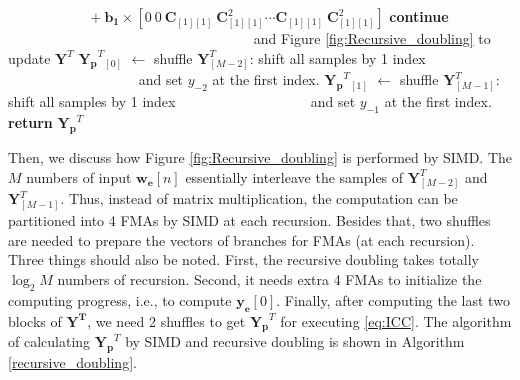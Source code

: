 \begin{algorithm}[t]
\begin{algorithmic}[1]
                    \Statex $ \quad\quad\quad\quad\quad~~~ + \bm{b_{1}} {\times}  \left[0 ~ 0 ~ \bm{C}_{[1][1]} ~ \bm{C}^2_{[1][1]} \cdots \bm{C}_{[1][1]} ~ \bm{C}^2_{[1][1]}\right]$ 
                    \State \textbf{continue} $\quad\quad\quad\quad~~$ 
                    \Statex $\quad\quad\quad\quad\quad\quad\quad\quad\quad\quad\quad\quad~~$ and Figure \ref{fig:Recursive_doubling} to update $\bm{Y}^T$
                \EndIf
            \EndFor
            \State $\bm{Y_p}^T$$_{[0]}$ $\gets $ shuffle $\bm{Y}^T_{[M-2]}$: shift all samples by 1 index
            \Statex $\quad\quad\quad\quad\quad\quad\quad\quad\quad$ and set $y_{-2}$ at the first index.
            \State $\bm{Y_p}^T$$_{[1]}$ $ \gets $ shuffle $\bm{Y}^T_{[M-1]}$: shift all samples by 1 index
            \Statex $\quad\quad\quad\quad\quad\quad\quad\quad\quad$ and set $y_{-1}$ at the first index.            
            \State \textbf{return} $\bm{Y_p}^T$ 
        \EndProcedure
    \end{algorithmic}
\end{algorithm}

Then, we discuss how Figure \ref{fig:Recursive_doubling} is performed by SIMD.
The $M$ numbers of input $\bm{w_e}[n]$ essentially interleave the samples of $\bm{Y}^T_{[M-2]}$ and $\bm{Y}^T_{[M-1]}$.
Thus, instead of matrix multiplication,
the computation can be partitioned into 4 FMAs by SIMD at each recursion.
Besides that, two shuffles are needed to prepare the vectors of branches for FMAs (at each recursion). 
Three things should also be noted. First, the recursive doubling takes totally $\log_2M$ numbers of recursion.
Second, it needs extra 4 FMAs to initialize the computing progress, i.e., to compute $\bm{y_e}[0]$.
Finally, after computing the last two blocks of $\bm{Y^T}$, 
we need 2 shuffles to get $\bm{Y_p}^T$ for executing \eqref{eq:ICC}. 
The algorithm of calculating $\bm{Y_p}^T$ by SIMD and recursive doubling is shown in Algorithm \ref{recursive_doubling}. 


